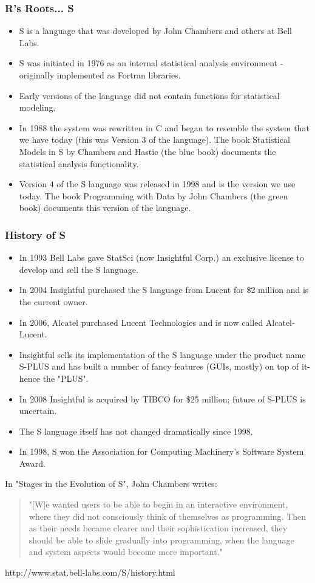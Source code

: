 \documentclass[10pt,slidestop,mathserif,c]{beamer}
\begin{document}
\begin{frame}[c]
	\frametitle{R's Roots... S}
	\begin{itemize}
	\item S is a language that was developed by John Chambers and others at Bell Labs.
	\item S was initiated in 1976 as an internal statistical analysis environment - originally implemented as Fortran libraries.
	\item Early versions of the language did not contain functions for statistical modeling.
	\item In 1988 the system was rewritten in C and began to resemble the system that we have today (this was Version 3 of the language). The book Statistical Models in S by Chambers and Hastie (the blue book) documents the statistical analysis functionality.
	\item Version 4 of the S language was released in 1998 and is the version we use today. The book Programming with Data by John Chambers (the green book) documents this version of the language.
	\end{itemize}
\end{frame}

\begin{frame}[c]
	\frametitle{History of S}
	\begin{itemize}
	\item In 1993 Bell Labs gave StatSci (now Insightful Corp.) an exclusive license to develop and sell the S language.
	\item In 2004 Insightful purchased the S language from Lucent for \$2 million and is the current owner.
	\item In 2006, Alcatel purchased Lucent Technologies and is now called Alcatel-Lucent.
	\item Insightful sells its implementation of the S language under the product name S-PLUS and has built a number of fancy features (GUIs, mostly) on top of it-hence the "PLUS".
	\item In 2008 Insightful is acquired by TIBCO for \$25 million; future of S-PLUS is uncertain.
	\item The S language itself has not changed dramatically since 1998.
	\item In 1998, S won the Association for Computing Machinery's Software System Award.
	\end{itemize}
\end{frame}

\begin{frame}[c]
In "Stages in the Evolution of S", John Chambers writes:
\begin{quote}
"[W]e wanted users to be able to begin in an interactive environment, where they did not consciously think of themselves as programming. Then as their needs became clearer and their sophistication increased, they should be able to slide gradually into programming, when the language and system aspects would become more important."
\end{quote}
http://www.stat.bell-labs.com/S/history.html
\end{frame}
\end{document}

